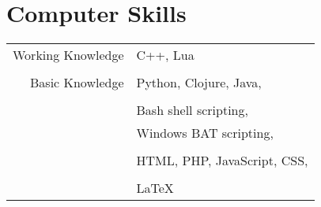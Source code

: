 \documentclass[10pt]{article} %
\begin{document}
{\begin{minipage}[t]{0.44\textwidth}
\begin{tabular}{rl}

\end{tabular}\\[10pt]







\section{Computer Skills} 

\begin{tabular}{rl}
Working Knowledge
& C++, Lua\\ 
& \\
Basic Knowledge
& Python, Clojure, Java, \\
& \\
& Bash shell scripting,\\
& Windows BAT scripting,\\
& \\
& HTML, PHP, JavaScript, CSS, \\
& \\
& \LaTeX
\end{tabular}


\end{minipage}}
\end{document}
